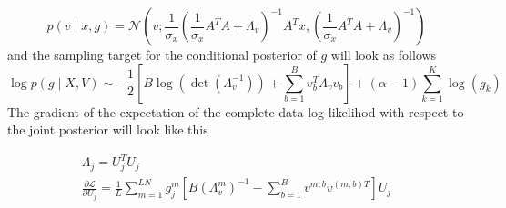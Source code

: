\documentclass{paper}
\begin{document}
\begin{equation}
p(v \mid x,g) = \mathcal{N}\left(v; \frac{1}{\sigma_x} \left(\frac{1}{\sigma_x} A^T A + \Lambda_v \right)^{-1} A^T x, \left(\frac{1}{\sigma_x} A^T A + \Lambda_v\right)^{-1}\right)
\end{equation}
%
and the sampling target for the conditional posterior of $g$ will look as follows
\begin{equation} 
\log p(g \mid X,V) \sim -\frac{1}{2} \left[B\log(\det(\Lambda_v^{-1})) + \sum_{b=1}^B v_b^T \Lambda_v v_b\right] + (\alpha-1) \sum_{k=1}^K \log(g_k)
\end{equation}
%
The gradient of the expectation of the complete-data log-likelihod with respect to the joint posterior will look like this

\begin{eqnarray}
\Lambda_j = U_j^T U_j \\
\frac{\partial \mathcal{L}}{\partial U_j} = \frac{1}{L} \sum_{m=1}^{LN} g_j^{m} \left[ B  \left( \Lambda_v^m \right)^{-1} - \sum_{b=1}^B v^{m,b} v^{(m,b)T} \right] U_j
\end{eqnarray}
\end{document}
